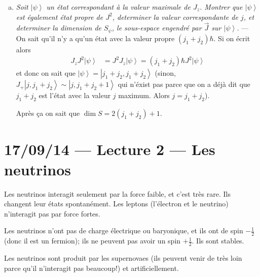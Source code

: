 \documentclass[10pt]{report}
\newcommand{\ket}[1]{\left|#1\right>}
\begin{document}
\begin{enumerate}[1)]
\begin{enumerate}[a)]
                Donc la d\'eg\'en\'erescence maximum est $3 = 2j_2 + 1$.
            \item \emph{Soit $\ket{\psi}$ un \'etat correspondant \`a la valeur maximale de $J_z$. Montrer que $\ket{\psi}$ est \'egalement \'etat propre de $J^2$, determiner la valeur correspondante de $j$, et determiner la dimension de $S_\psi$, le sous-espace engendr\'e par $\vec{J}$ sur $\ket{\psi}$.} --- On sait qu'il n'y a qu'un \'etat avec la valeur propre $(j_1 + j_2)\hbar$. Si on \'ecrit alors 
                \begin{align}
                    J_z J^2\ket{\psi}  &= J^2J_z \ket{\psi} = (j_1 + j_2)\hbar J^2\ket{\psi}
                \end{align}
                et donc on sait que $\ket{\psi} = \ket{j_1 + j_2, j_1 + j_2}$ (sinon, $J_+\ket{j, j_1 + j_2} \sim \ket{j, j_1 + j_2 + 1}$ qui n'\'exist pas parce que on a d\'ej\`a dit que $j_1 + j_2$ est l'\'etat avec la valeur $j$ maximum. Alors $j = j_1 + j_2$).

                Apr\`es \c{c}a on sait que $\dim S = 2(j_1 + j_2) + 1$.
        \end{enumerate}
\end{enumerate}

\chapter{17/09/14 --- Lecture 2 --- Les neutrinos}

Les neutrinos interagit seulement par la force faible, et c'est tr\`es rare. Ils changent leur \'etats spontan\'ement. Les leptons (l'\'electron et le neutrino) n'interagit pas par force fortes.

Les neutrinos n'ont pas de charge \'electrique ou baryonique, et ils ont de spin $-\frac{1}{2}$ (donc il est un fermion); ils ne peuvent pas avoir un spin $+\frac{1}{2}$. Ils sont stables.

Les neutrinos sont produit par les supernovaes (ils peuvent venir de tr\`es loin parce qu'il n'interagit pas beaucoup!) et artificiellement.
\end{document}
